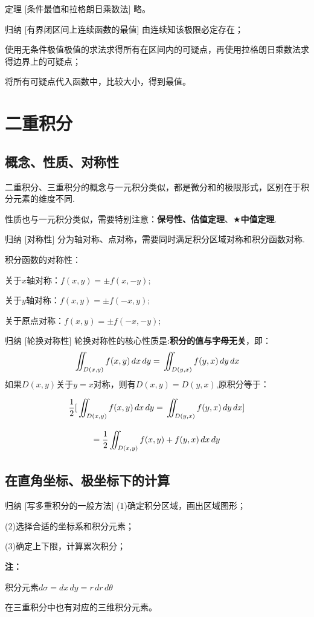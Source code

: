 \documentclass[a4paper,12pt,oneside,fontset=none]{ctexbook}
\let\olddfrac\dfrac
\renewcommand{\dfrac}[2]{
    \olddfrac{#1\vrule width 0pt height 1.15em depth 0em}{#2\vrule width 0pt height 0em depth 0.6em}
}
\let\oldiint\iint
\renewcommand{\iint}{\displaystyle{\vrule width 0pt height 0em depth 0em}\oldiint}
\newcounter{theorem}[chapter]
\newenvironment{theorem}[1][]{\begin{thmBox}{定理}{#1}}{\end{thmBox}}
\newenvironment{induction}[1][]{\begin{thmBox}{归纳}{#1}}{\end{thmBox}}
\newenvironment{note}{
    \par\vspace{0.5em}\noindent
    \textbf{\color{NoteColor} 注：}
}{
    \par\vspace{0.5em}
}
\numberwithin{equation}{chapter}
\begin{document}
\begin{theorem}
    [条件最值和拉格朗日乘数法]
    略。
\end{theorem}


\begin{induction}
    [有界闭区间上连续函数的最值]
    由连续知该极限必定存在；

    使用无条件极值极值的求法求得所有在区间内的可疑点，再使用拉格朗日乘数法求得边界上的可疑点；

    将所有可疑点代入函数中，比较大小，得到最值。
\end{induction}


\chapter{二重积分}

\section{概念、性质、对称性}
二重积分、三重积分的概念与一元积分类似，都是微分和的极限形式，区别在于积分元素的维度不同.

性质也与一元积分类似，需要特别注意：\textbf{保号性、估值定理}、$\bigstar$\textbf{中值定理}.
\begin{induction}
    [对称性]
    分为轴对称、点对称，需要同时满足积分区域对称和积分函数对称.
    
    积分函数的对称性：

    关于$x$轴对称：$f(x,y) = \pm f(x,-y);$
    
    关于$y$轴对称：$f(x,y) = \pm f(-x,y);$

    关于原点对称：$f(x,y) = \pm f(-x,-y);$
\end{induction}
\begin{induction}
    [轮换对称性]
    轮换对称性的核心性质是:\textbf{积分的值与字母无关}，即：
    $$\iint_{D(x,y)} f(x,y) \, dx \, dy = \iint_{D(y,x)} f(y,x) \, dy \, dx$$
    如果$D(x,y)$关于$y=x$对称，则有$D(x,y)=D(y,x)$,原积分等于：
    $$\dfrac{1}{2}[\iint_{D(x,y)} f(x,y) \, dx \, dy = \iint_{D(y,x)} f(y,x) \, dy \, dx]$$
    $$=\dfrac{1}{2}\iint_{D(x,y)} f(x,y) + f(y,x) \, dx \, dy$$
\end{induction}

\section{在直角坐标、极坐标下的计算}
\begin{induction}
    [写多重积分的一般方法]
    (1)确定积分区域，画出区域图形；
    
    (2)选择合适的坐标系和积分元素；
    
    (3)确定上下限，计算累次积分；
\end{induction}
\begin{note}
    积分元素$d\sigma = dx\, dy = r\, dr\, d\theta$
    
    在三重积分中也有对应的三维积分元素。
\end{note}
\end{document}
